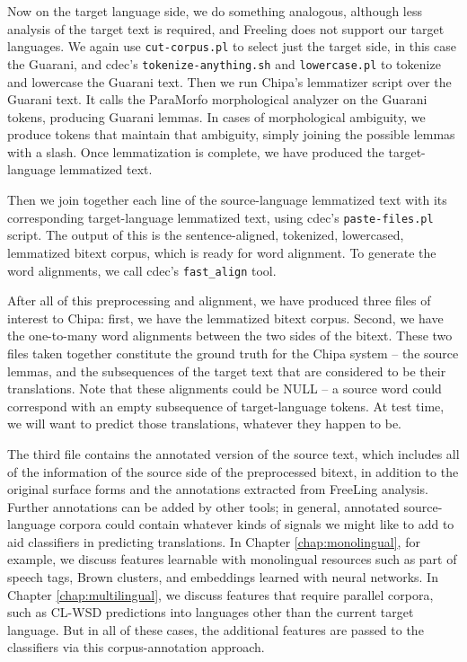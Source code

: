 Now on the target language side, we do something analogous, although less
analysis of the target text is required, and Freeling does not support our
target languages. We again use \texttt{cut-corpus.pl} to select just the target
side, in this case the Guarani, and cdec's \texttt{tokenize-anything.sh} and
\texttt{lowercase.pl} to tokenize and lowercase the Guarani text. Then we run
Chipa's lemmatizer script over the Guarani text. It calls the ParaMorfo
morphological analyzer on the Guarani tokens, producing Guarani lemmas. In
cases of morphological ambiguity, we produce tokens that maintain that
ambiguity, simply joining the possible lemmas with a slash.  Once lemmatization
is complete, we have produced the target-language lemmatized text.

Then we join together each line of the source-language lemmatized text with its
corresponding target-language lemmatized text, using cdec's
\texttt{paste-files.pl} script. The output of this is the sentence-aligned,
tokenized, lowercased, lemmatized bitext corpus, which is ready for word
alignment. To generate the word alignments, we call cdec's \texttt{fast\_align}
tool.

After all of this preprocessing and alignment, we have produced three files of
interest to Chipa: first, we have the lemmatized bitext corpus. Second, we have
the one-to-many word alignments between the two sides of the bitext. These two
files taken together constitute the ground truth for the Chipa system -- the
source lemmas, and the subsequences of the target text that are considered to
be their translations. Note that these alignments could be NULL -- a source
word could correspond with an empty subsequence of target-language tokens. At
test time, we will want to predict those translations, whatever they happen to
be.

The third file contains the annotated version of the source text, which
includes all of the information of the source side of the preprocessed bitext,
in addition to the original surface forms and the annotations extracted from
FreeLing analysis. Further annotations can be added by other tools; in general,
annotated source-language corpora could contain whatever kinds of signals we
might like to add to aid classifiers in predicting translations. In Chapter
\ref{chap:monolingual}, for example, we discuss features learnable with
monolingual resources such as part of speech tags, Brown clusters, and
embeddings learned with neural networks. In Chapter \ref{chap:multilingual}, we
discuss features that require parallel corpora, such as CL-WSD predictions into
languages other than the current target language. But in all of these cases,
the additional features are passed to the classifiers via this
corpus-annotation approach.



